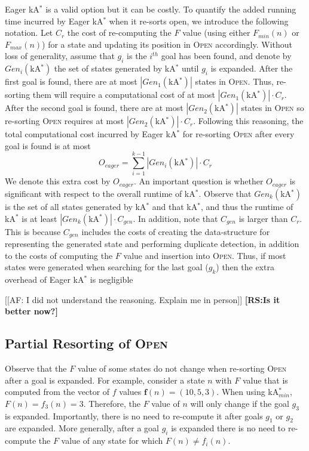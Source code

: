 \documentclass{aicom2e}
\newcommand{\kastar}{kA$^*$}
\newcommand{\kastarmin}{kA$^*_{min}$}
\newcommand{\minf}{$F_{min}(n)$}
\newcommand{\maxf}{$F_{max}(n)$}
\newcommand{\open}{\textsc{Open}}
\newcommand{\roni}[1]{\textbf{[RS:#1]}}
\begin{document}
Eager \kastar{} is a valid option but it can be costly. To quantify the added running time
incurred by Eager \kastar{} when it re-sorts open, we introduce the following notation.
Let $C_r$ the cost of re-computing the $F$ value (using either \minf{} or \maxf{}) for a state and updating its position in \open{} accordingly. Without loss of generality, assume that $g_i$ is the  $i^{th}$ goal has been found, and denote by $Gen_i(\text{\kastar{}})$ the set of  states generated by \kastar{} until $g_i$ is expanded. After the first goal is found, there are at most $|Gen_1(\text{\kastar{}})|$ states in \open{}. Thus, re-sorting them will require a computational cost of at most $|Gen_1(\text{\kastar{}})|\cdot C_r$. After the second goal is found, there
are at most $|Gen_2(\text{\kastar{}})|$ states in \open{} so re-sorting \open{} requires at most
$|Gen_2(\text{\kastar{}})|\cdot C_r$. Following this reasoning, the total computational
cost incurred by Eager \kastar{} for re-sorting \open{} after every goal is found is at most
\begin{equation}
O_{eager}=\sum_{i=1}^{k-1} |Gen_i(\text{\kastar{}})|\cdot C_r
\label{eq:re-sort-cost}
\end{equation}
We denote this extra cost by $O_{eager}$.
An important question is whether $O_{eager}$ is significant with respect to the overall runtime of \kastar{}. Observe that $Gen_k(\text{\kastar{}})$ is the set of all states generated by \kastar{}
and that \kastar{}, and thus the runtime of \kastar{} is at least
$|Gen_k(\text{\kastar{}})|\cdot C_{gen}$.
In addition, note that $C_{gen}$ is larger than $C_r$.
This is because $C_{gen}$ includes the costs of creating the data-structure for representing the generated state and performing duplicate detection,
in addition to the costs of computing the $F$ value and insertion into \open{}.
Thus, if most states were generated when searching for the last goal ($g_k$)
then the extra overhead of Eager \kastar{} is negligible

[[AF: I did not understand the reasoning. Explain me in person]]
\roni{Is it better now?}

\subsection{Partial Resorting of \open{}}
Observe that the $F$ value of some states do not change when re-sorting \open{} after a goal is expanded.
For example, consider a state $n$ with $F$ value that is computed from the vector of $f$ values $\textbf{f}(n)=(10,5,3)$. When using \kastarmin{}, $F(n)=f_3(n)=3$. Therefore, the $F$ value of $n$ will only change if the goal $g_3$ is expanded. Importantly, there is no need to re-compute it after goals $g_1$ or $g_2$ are expanded. More generally, after a goal $g_i$ is expanded there is no need to re-compute the $F$ value
of any state for which $F(n)\neq f_i(n)$.
\end{document}

